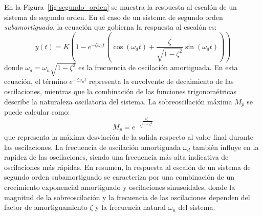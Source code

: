 %
En la Figura~\ref{fig:segundo_orden} se muestra la respuesta al escalón de un sistema de segundo orden. En el caso de un sistema de segundo orden \emph{subamortiguado}, la ecuación que gobierna la respuesta al escalón es:
\begin{equation}
    y(t) = K \left( 1 - e^{-\zeta \omega_n t} \left( \cos(\omega_d t) + \frac{\zeta}{\sqrt{1-\zeta^2}} \sin(\omega_d t) \right) \right)
\end{equation}
donde $\omega_d = \omega_n \sqrt{1-\zeta^2}$ es la frecuencia de oscilación amortiguada. En esta ecuación, el término $e^{-\zeta \omega_n t}$ representa la envolvente de decaimiento de las oscilaciones, mientras que la combinación de las funciones trigonométricas describe la naturaleza oscilatoria del sistema. La sobreoscilación máxima $M_p$ se puede calcular como:
\begin{equation}
    M_p = e^{-\frac{\pi \zeta}{\sqrt{1-\zeta^2}}}
\end{equation}
que representa la máxima desviación de la salida respecto al valor final durante las oscilaciones. La frecuencia de oscilación amortiguada $\omega_d$ también influye en la rapidez de las oscilaciones, siendo una frecuencia más alta indicativa de oscilaciones más rápidas. En resumen, la respuesta al escalón de un sistema de segundo orden subamortiguado se caracteriza por una combinación de un crecimiento exponencial amortiguado y oscilaciones sinusoidales, donde la magnitud de la sobreoscilación y la frecuencia de las oscilaciones dependen del factor de amortiguamiento $\zeta$ y la frecuencia natural $\omega_n$ del sistema.
